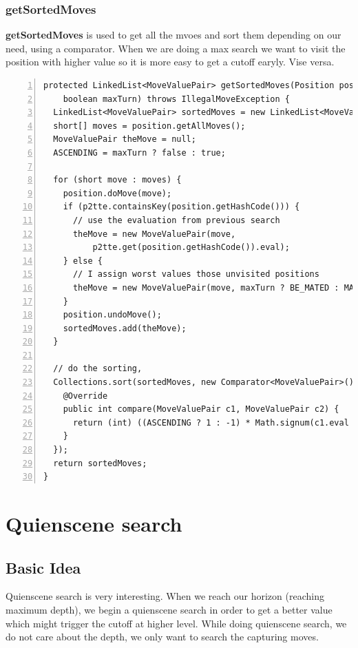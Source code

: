 \documentclass{article}
\begin{document}
\subsubsection{getSortedMoves}

\textbf{getSortedMoves} is used to get all the mvoes and sort them depending on our need, using a comparator. When we are doing a max search we want to visit the position with higher value so it is more easy to get a cutoff earyly. Vise versa.

\begin{lstlisting}[numbers=left]
protected LinkedList<MoveValuePair> getSortedMoves(Position position, 
    boolean maxTurn) throws IllegalMoveException {
  LinkedList<MoveValuePair> sortedMoves = new LinkedList<MoveValuePair>();
  short[] moves = position.getAllMoves();
  MoveValuePair theMove = null;
  ASCENDING = maxTurn ? false : true;

  for (short move : moves) {
    position.doMove(move);
    if (p2tte.containsKey(position.getHashCode())) {
      // use the evaluation from previous search
      theMove = new MoveValuePair(move,
          p2tte.get(position.getHashCode()).eval);
    } else {
      // I assign worst values those unvisited positions
      theMove = new MoveValuePair(move, maxTurn ? BE_MATED : MATE);
    }
    position.undoMove();
    sortedMoves.add(theMove);
  }

  // do the sorting, 
  Collections.sort(sortedMoves, new Comparator<MoveValuePair>() {
    @Override
    public int compare(MoveValuePair c1, MoveValuePair c2) {
      return (int) ((ASCENDING ? 1 : -1) * Math.signum(c1.eval - c2.eval)); 
    }
  });
  return sortedMoves;
}
\end{lstlisting}








\clearpage
\section{Quienscene search}
\subsection{Basic Idea}
Quienscene search is very interesting. When we reach our horizon (reaching maximum depth), we begin a quienscene search in order to get a  better value which might trigger the cutoff at higher level. While doing quienscene search, we do not care about the depth, we only want to search the capturing moves.
\end{document}
